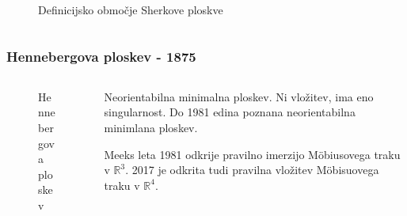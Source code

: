 \documentclass[8pt]{beamer}
\newcommand{\samplescalar}{50} %
\theoremstyle{definition}
\theoremstyle{remark}
\theoremstyle{plain}
\numberwithin{equation}{section}  %
\begin{document}
\begin{frame}
\begin{columns}
\begin{column}{0.76\textwidth}
\begin{figure}[H]
                \caption{Definicijsko območje Sherkove ploskve}
            \end{figure}
            
        \end{column}
    \end{columns}
 
\end{frame}

\begin{frame}
    \frametitle{Hennebergova ploskev - 1875}

    \begin{columns}
        \begin{column}{0.5\textwidth}
            \centering
            \begin{figure}[H]
                \centering
                \caption{Hennebergova ploskev}
            \end{figure}
        \end{column}

        \begin{column}{0.5\textwidth}
            \textcolor{red1}{Neorientabilna minimalna ploskev}. Ni vložitev, ima eno singularnost. Do 1981 edina poznana neorientabilna minimlana ploskev. 

            \vspace{0.8em}

            Meeks leta 1981 odkrije pravilno imerzijo Möbiusovega traku v $\mathbb{R}^3$. 2017 je odkrita tudi pravilna vložitev Möbisuovega traku v $\mathbb{R}^4$.
        \end{column}
    \end{columns}
    
\end{frame}
\end{document}
